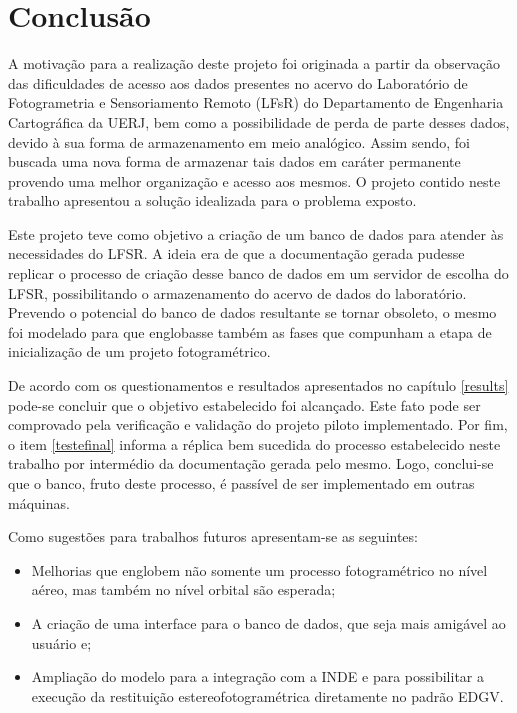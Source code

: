 \chapter*{Conclusão}
A motivação para a realização deste projeto foi originada a partir da observação das dificuldades de acesso aos dados presentes no acervo do Laboratório de Fotogrametria e Sensoriamento Remoto (LFsR) do Departamento de Engenharia Cartográfica da UERJ, bem como a possibilidade de perda de parte desses dados, devido à sua forma de armazenamento em meio analógico. Assim sendo, foi buscada uma nova forma de armazenar tais dados em caráter permanente provendo uma melhor organização e acesso aos mesmos. O projeto contido neste trabalho apresentou a solução idealizada para o problema exposto. 

Este projeto teve como objetivo a criação de um banco de dados para atender às necessidades do LFSR. A ideia era de que a documentação gerada pudesse replicar o processo de criação desse banco de dados em um servidor de escolha do LFSR, possibilitando o armazenamento do acervo de dados do laboratório. Prevendo o potencial do banco de dados resultante se tornar obsoleto, o mesmo foi modelado para que englobasse também as fases que compunham a etapa de inicialização de um projeto fotogramétrico.


De acordo com os questionamentos e resultados apresentados no capítulo \ref{results} pode-se concluir que o objetivo estabelecido foi alcançado. Este fato pode ser comprovado pela verificação e validação do projeto piloto implementado. Por fim, o item \ref{testefinal} informa a réplica bem sucedida do processo estabelecido neste trabalho por intermédio da documentação gerada pelo mesmo. Logo, conclui-se que o banco, fruto deste processo, é passível de ser implementado em outras máquinas.  

Como sugestões para trabalhos futuros apresentam-se as seguintes:

\begin{itemize}
    \item Melhorias que englobem não somente um processo fotogramétrico no nível aéreo, mas também no nível orbital são esperada;
    \item A criação de uma interface para o banco de dados, que seja mais amigável ao usuário e;
    \item Ampliação do modelo para a integração com a INDE e para possibilitar a execução da restituição estereofotogramétrica diretamente no padrão EDGV.
\end{itemize}
